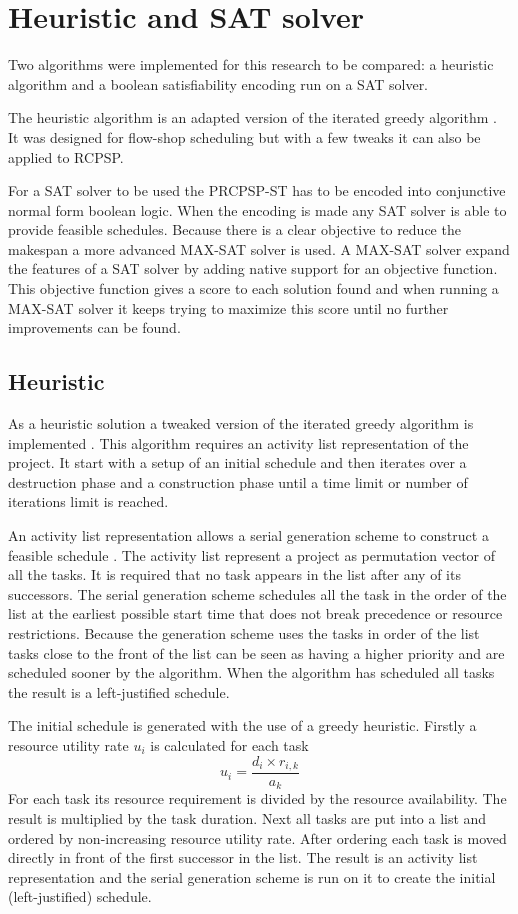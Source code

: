 \section{Heuristic and SAT solver}
Two algorithms were implemented for this research to be compared: a heuristic algorithm and a boolean satisfiability encoding run on a SAT solver.

The heuristic algorithm is an adapted version of the iterated greedy algorithm \cite{RN32}. It was designed for flow-shop scheduling but with a few tweaks it can also be applied to RCPSP.

For a SAT solver to be used the PRCPSP-ST has to be encoded into conjunctive normal form boolean logic. When the encoding is made any SAT solver is able to provide feasible schedules. Because there is a clear objective to reduce the makespan a more advanced MAX-SAT solver is used. A MAX-SAT solver expand the features of a SAT solver by adding native support for an objective function. This objective function gives a score to each solution found and when running a MAX-SAT solver it keeps trying to maximize this score until no further improvements can be found.

\subsection{Heuristic}
As a heuristic solution a tweaked version of the iterated greedy algorithm is implemented \cite{RN32}. This algorithm requires an activity list representation of the project. It start with a setup of an initial schedule and then iterates over a destruction phase and a construction phase until a time limit or number of iterations limit is reached. 

An activity list representation allows a serial generation scheme to construct a feasible schedule \cite{RN46}. The activity list represent a project as permutation vector of all the tasks. It is required that no task appears in the list after any of its successors. The serial generation scheme schedules all the task in the order of the list at the earliest possible start time that does not break precedence or resource restrictions. Because the generation scheme uses the tasks in order of the list tasks close to the front of the list can be seen as having a higher priority and are scheduled sooner by the algorithm. When the algorithm has scheduled all tasks the result is a left-justified schedule.

The initial schedule is generated with the use of a greedy heuristic. Firstly a resource utility rate \(u_i\) is calculated for each task 
\begin{equation}
u_i=\frac{d_i \times r_{i,k}}{a_k} 
\end{equation}
For each task its resource requirement is divided by the resource availability. The result is multiplied by the task duration. Next all tasks are put into a list and ordered by non-increasing resource utility rate. After ordering each task is moved directly in front of the first successor in the list. The result is an activity list representation and the serial generation scheme is run on it to create the initial (left-justified) schedule.

